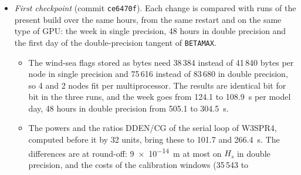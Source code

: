\documentclass[11pt,a4paper]{article}
\begin{document}
\begin{itemize}
\begin{itemize}
per multiprocessor in single precision and 2 in double precision,
about 15 to 20\,\% and 35 to 45\,\% less time;
\item arrays not alive at the same time sharing memory, bit for bit
identical: one more node per multiprocessor in single precision for
each \SI{5.8}{KB} saved;
\item order-independent scalar parts done by all units, a few per cent
each;
\item the tangent kernel brought under \SI{83}{KB} (2 nodes), about
40\,\% less time;
\item a vector tangent carrying several directions on one value path,
about 2.2 times cheaper than 9 runs for the directions of
\texttt{BETAMAX}$(U)$;
\item a single-precision tangent, behind an option until it passes the
checks of M3 against double precision, about 4 times faster;
\item parallel reductions of the scalar sums, which change the order of
the sums of WW3 and so the round-off, behind an option, up to 40\,\% of
the source kernel;
\item fused geographic sweeps, about 5\,\%;
\item asynchronous outputs, last if at all.
\end{itemize}
Nsight Compute cannot run on the hpc cluster: the performance counters
of the GPUs are reserved to the administrators (job 4416360).
\item \emph{First checkpoint} (commit \texttt{ce6470f}). Each change is
compared with runs of the present build over the same hours, from the
same restart and on the same type of GPU: the week in single precision,
48 hours in double precision and the first day of the double-precision
tangent of \texttt{BETAMAX}.
\begin{itemize}
\item The wind-sea flags stored as bytes need 38\,384 instead of 41\,840
bytes per node in single precision and 75\,616 instead of 83\,680 in
double precision, so 4 and 2 nodes fit per multiprocessor. The results
are identical bit for bit in the three runs, and the week goes from
124.1 to \SI{108.9}{s} per model day, 48 hours in double precision from
505.1 to \SI{304.5}{s}.
\item The powers and the ratios DDEN/CG of the serial loop of W3SPR4,
computed before it by 32 units, bring these to 101.7 and \SI{266.4}{s}.
The differences are at round-off: \SI{9e-14}{m} at most on $H_s$ in
double precision, and the costs of the calibration windows (35\,543 to

\end{itemize}
\end{itemize}
\end{document}
